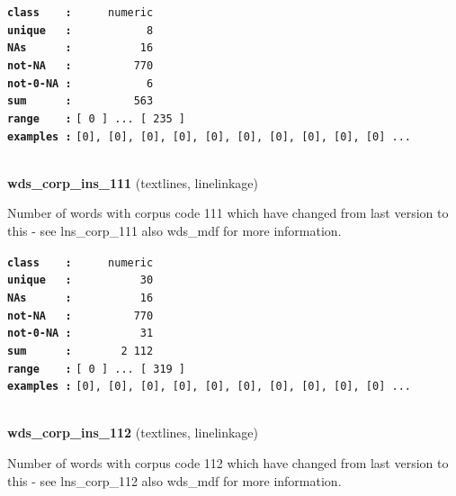 \documentclass[]{article}
\begin{document}
\textbf{\texttt{class\ \ \ \ :}} \texttt{~~~~~numeric}\\
\textbf{\texttt{unique\ \ \ :}} \texttt{~~~~~~~~~~~8}\\
\textbf{\texttt{NAs\ \ \ \ \ \ :}} \texttt{~~~~~~~~~~16}\\
\textbf{\texttt{not-NA\ \ \ :}} \texttt{~~~~~~~~~770}\\
\textbf{\texttt{not-0-NA\ :}} \texttt{~~~~~~~~~~~6}\\
\textbf{\texttt{sum\ \ \ \ \ \ :}} \texttt{~~~~~~~~~563}\\
\textbf{\texttt{range\ \ \ \ :}}
\texttt{{[}\ 0\ {]}\ ...\ {[}\ 235\ {]}}\\
\textbf{\texttt{examples\ :}}
\texttt{{[}0{]},\ {[}0{]},\ {[}0{]},\ {[}0{]},\ {[}0{]},\ {[}0{]},\ {[}0{]},\ {[}0{]},\ {[}0{]},\ {[}0{]}\ ...}\\

~

\textbf{wds\_corp\_ins\_111} (textlines, linelinkage)

Number of words with corpus code 111 which have changed from last
version to this - see lns\_corp\_111 also wds\_mdf for more information.

\textbf{\texttt{class\ \ \ \ :}} \texttt{~~~~~numeric}\\
\textbf{\texttt{unique\ \ \ :}} \texttt{~~~~~~~~~~30}\\
\textbf{\texttt{NAs\ \ \ \ \ \ :}} \texttt{~~~~~~~~~~16}\\
\textbf{\texttt{not-NA\ \ \ :}} \texttt{~~~~~~~~~770}\\
\textbf{\texttt{not-0-NA\ :}} \texttt{~~~~~~~~~~31}\\
\textbf{\texttt{sum\ \ \ \ \ \ :}} \texttt{~~~~~~~2~112}\\
\textbf{\texttt{range\ \ \ \ :}}
\texttt{{[}\ 0\ {]}\ ...\ {[}\ 319\ {]}}\\
\textbf{\texttt{examples\ :}}
\texttt{{[}0{]},\ {[}0{]},\ {[}0{]},\ {[}0{]},\ {[}0{]},\ {[}0{]},\ {[}0{]},\ {[}0{]},\ {[}0{]},\ {[}0{]}\ ...}\\

~

\textbf{wds\_corp\_ins\_112} (textlines, linelinkage)

Number of words with corpus code 112 which have changed from last
version to this - see lns\_corp\_112 also wds\_mdf for more information.
\end{document}
